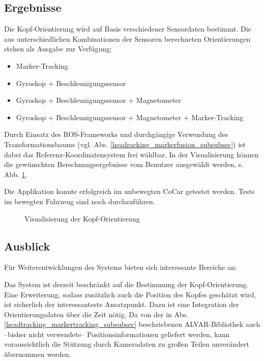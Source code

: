 
\subsection{Ergebnisse}

Die Kopf-Orientierung wird auf Basis verschiedener Sensordaten bestimmt.
Die aus unterschiedlichen Kombinationen der Sensoren berechneten Orientierungen stehen als Ausgabe zur Verfügung:
\begin{itemize}
  \item Marker-Tracking
  \item Gyroskop + Beschleunigungssensor
  \item Gyroskop + Beschleunigungssensor + Magnetometer
  \item Gyroskop + Beschleunigungssensor + Magnetometer + Marker-Tracking
\end{itemize}

Durch Einsatz des \ac{ROS}-Frameworks und durchgängige Verwendung des Transformationsbaums (vgl. Abs. \ref{headracking_markerfusion_subsubsec}) ist dabei das Referenz-Koordinatensystem frei wählbar.
In der Visualisierung können die gewünschten Berechnungsergebnisse vom Benutzer ausgewählt werden, s. Abb. \ref{fig:kopf_orientierung_rviz}.


Die Applikation konnte erfolgreich im unbewegten CoCar getestet werden.
Tests im bewegten Fahrzeug sind noch durchzuführen.


\begin{figure}
  \centering
  \caption{Visualisierung der Kopf-Orientierung}
  \label{fig:kopf_orientierung_rviz}
\end{figure}


\subsection{Ausblick}

Für Weiterentwicklungen des Systems bieten sich interessante Bereiche an:

Das System ist derzeit beschränkt auf die Bestimmung der Kopf-Orientierung.
Eine Erweiterung, sodass zusätzlich auch die Position des Kopfes geschätzt wird, ist sicherlich der interessanteste Ansatzpunkt.
Dazu ist eine Integration der Orientierungsdaten über die Zeit nötig.
Da von der in Abs. \ref{headtracking_markertracking_subsubsec} beschriebenen ALVAR-Bibliothek auch --bisher nicht verwendete-- Positionsinformationen geliefert werden, kann voraussichtlich die Stützung durch Kameradaten zu großen Teilen unverändert übernommen werden.


